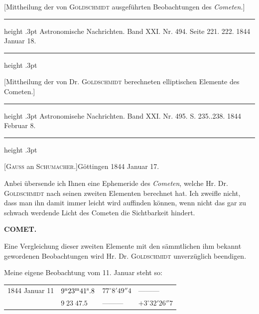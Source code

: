 [Mittheilung der von \textsc{Goldschmidt} ausgeführten Beobachtungen des \emph{Cometen.}]

\par\bigskip
{}
\hypertarget{native-469-notice1844}{}
\begin{center}
\parbox{.78\linewidth}{%
\centering\small
\hrule height .3pt\relax\vspace{2.5pt}
Astronomische Nachrichten. Band XXI. Nr. 494. Seite 221. 222. 1844 Januar 18.\par
\vspace{2.5pt}\hrule height .3pt\relax
}
\end{center}

[Mittheilung der von Dr. \textsc{Goldschmidt} berechneten elliptischen Elemente des Cometen.]

\par\bigskip
{}
\hypertarget{native-469-letter}{}
\begin{center}
\parbox{.79\linewidth}{%
\centering\small
\hrule height .3pt\relax\vspace{2.5pt}
Astronomisehe Nachrichten. Band XXI. Nr. 495. S. 235..238. 1844 Februar 8.\par
\vspace{2.5pt}\hrule height .3pt\relax
}
\end{center}

\begin{center}[\textsc{Gauss} an \textsc{Schumacher.}]\quad Göttingen 1844 Januar 17.\end{center}

Anbei übersende ich Ihnen eine Ephemeride des \emph{Cometen}, welche Hr. Dr. \textsc{Goldschmidt} nach seinen zweiten Elementen berechnet hat. Ich zweifle nicht, dass man ihn damit immer leicht wird auffinden können, wenn nicht das gar zu schwach werdende Licht des Cometen die Sichtbarkeit hindert.

\clearpage
\thispagestyle{empty}
\noindent{}%
\makebox[12mm][l]{}%
\parbox[t]{\dimexpr\linewidth-24mm\relax}{\centering\footnotesize\bfseries COMET.\par}%
\par\nobreak\medskip
Eine Vergleichung dieser zweiten Elemente mit den sämmtlichen ihm bekannt gewordenen Beobachtungen wird Hr. Dr. \textsc{Goldschmidt} unverzüglich beendigen.

Meine eigene Beobachtung vom 11. Januar steht so:
\begin{center}
\begin{tabular}{l|l|l|l}
1844 Januar 11 & $9^{\rm u}23^{\rm m}41^{\rm s}.8$ & $77^\circ8'49''4$ & ---\quad ---\quad --- \\
 & $9\;23\;47.5$ & ---\quad ---\quad --- & $+3^\circ32'26''7$ \\
\end{tabular}
\end{center}

